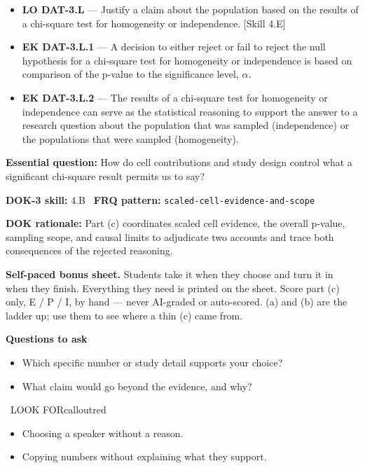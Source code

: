 \documentclass[11pt]{article}
\begin{document}
{\begin{itemize}[leftmargin=1.5em,itemsep=2pt,topsep=2pt]
  \item \textbf{LO DAT-3.L} --- Justify a claim about the population based on the results of a chi-square test for homogeneity or independence. [Skill 4.E]
  \item \textbf{EK DAT-3.L.1} --- A decision to either reject or fail to reject the null hypothesis for a chi-square test for homogeneity or independence is based on comparison of the p-value to the significance level, $\alpha$.
  \item \textbf{EK DAT-3.L.2} --- The results of a chi-square test for homogeneity or independence can serve as the statistical reasoning to support the answer to a research question about the population that was sampled (independence) or the populations that were sampled (homogeneity).
\end{itemize}
}
\textbf{Essential question:} How do cell contributions and study design control what a significant chi-square result permits us to say?\par
\textbf{DOK-3 skill:} 4.B \textperiodcentered\ \textbf{FRQ pattern:} {\small\texttt{scaled-\allowbreak{}cell-\allowbreak{}evidence-\allowbreak{}and-\allowbreak{}scope}}\par
\textbf{DOK rationale:} Part (c) coordinates scaled cell evidence, the overall p-value, sampling scope, and causal limits to adjudicate two accounts and trace both consequences of the rejected reasoning.\par

\textbf{Self-paced bonus sheet.} Students take it when they choose and turn it in when they finish. Everything they need is printed on the sheet. Score part (c) only, E / P / I, by hand --- never AI-graded or auto-scored. (a) and (b) are the ladder up; use them to see where a thin (c) came from.\par

\textbf{Questions to ask}
\begin{itemize}[leftmargin=1.5em,itemsep=2pt,topsep=2pt]
  \item Which specific number or study detail supports your choice?
  \item What claim would go beyond the evidence, and why?
\end{itemize}

\begin{callout}{\IconWarn\ LOOK FOR}{calloutred}
\begin{itemize}[leftmargin=1.5em,itemsep=2pt,topsep=2pt]
  \item Choosing a speaker without a reason.
  \item Copying numbers without explaining what they support.
\end{itemize}
\end{callout}
\end{document}
